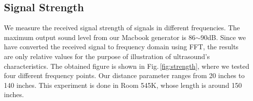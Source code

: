 


\subsection{Signal Strength}
\label{sec:signal-strength}
We measure the received signal strength of signals in different frequencies. The maximum output sound level from our Macbook generator is 86$\sim$90dB. Since we have converted the received signal to frequency domain using FFT, the results are only relative values for the purpose of illustration of ultrasound's characteristics. The obtained figure is shown in Fig.\,\ref{fig:strength}, where we tested four different frequency points. Our distance parameter ranges from 20 inches to 140 inches. This experiment is done in Room 545K, whose length is around 150 inches. 

